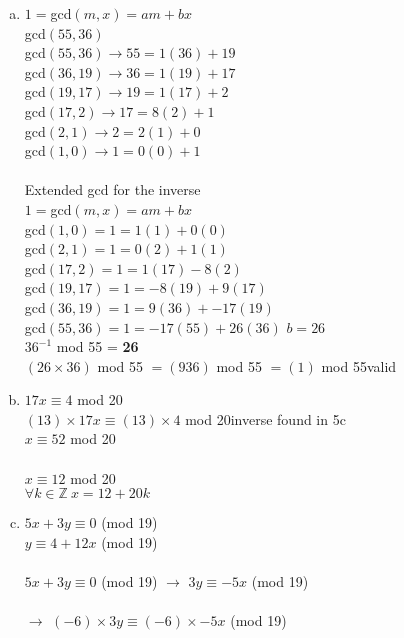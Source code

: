 \documentclass[11pt,letterpaper]{article}
\begin{document}
\begin{enumerate}[(a)]
$= 8\times3^{-1}$ mod 20\\
$= 8\times7$ mod 20\hfill inverse found in 5c\\
$= 56$ mod 20\\
$= 16$ mod 20\\
\item
$1=$gcd$(m,x)=am+bx$\\
gcd$(55,36)$\\
gcd$(55,36)\rightarrow55 = 1(36) + 19$\\
gcd$(36,19)\rightarrow36 = 1(19)+ 17$\\
gcd$(19,17)\rightarrow19 = 1(17)+ 2$\\
gcd$(17,2)\rightarrow17 = 8(2)+ 1$\\
gcd$(2,1)\rightarrow2 = 2(1)+ 0$\\
gcd$(1,0)\rightarrow1 = 0(0)+ 1$\\
\\
Extended gcd for the inverse\\
$1=$gcd$(m,x)=am+bx$\\
gcd$(1,0)=1= 1(1)+ 0(0)$\\
gcd$(2,1)=1 = 0(2)+ 1(1)$\\
gcd$(17,2)=1 = 1(17)- 8(2)$\\
gcd$(19,17)=1 = -8(19) + 9(17)$\\
gcd$(36,19)=1 = 9(36) + -17(19)$\\
gcd$(55,36)=1 = -17(55) + 26(36)$  $b=26$\\
$36^{-1}$ mod 55 = \textbf{26}\\
$(26\times36)$ mod 55 $=(936)$ mod 55 $=(1)$ mod 55\hfill valid\\
\item
$17x\equiv4$ mod 20\\
$(13)\times17x\equiv(13)\times4$ mod 20\hfill inverse found in 5c\\
$x\equiv52$ mod 20\\
\\
$x\equiv12$ mod 20\\
$\forall k\in\mathbb{Z}~x=12+20k$\\
\clearpage
\item
$5x+3y\equiv0$ (mod 19)\\
$y\equiv4+12x$ (mod 19)\\\\
$5x+3y\equiv0$ (mod 19) $\rightarrow$ $3y\equiv-5x$ (mod 19)\\ \\
$\rightarrow$ $(-6)\times3y\equiv(-6)\times-5x$ (mod 19)\\

\end{enumerate}
\end{document}
